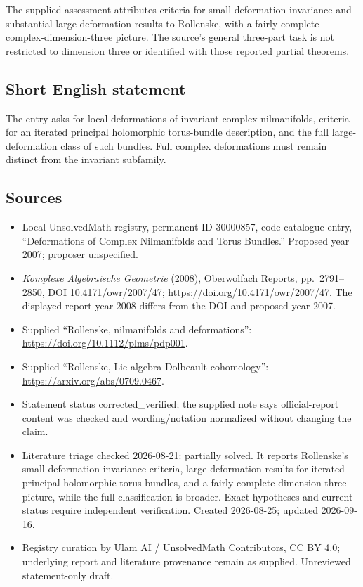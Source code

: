 \documentclass[11pt]{article}
\begin{document}
The supplied assessment attributes criteria for small-deformation invariance and substantial large-deformation results to Rollenske, with a fairly complete complex-dimension-three picture. The source's general three-part task is not restricted to dimension three or identified with those reported partial theorems.
\subsection{Short English statement}
The entry asks for local deformations of invariant complex nilmanifolds, criteria for an iterated principal holomorphic torus-bundle description, and the full large-deformation class of such bundles. Full complex deformations must remain distinct from the invariant subfamily.
\subsection{Sources}
\begin{itemize}
\item Local UnsolvedMath registry, permanent ID 30000857, code catalogue entry, ``Deformations of Complex Nilmanifolds and Torus Bundles.'' Proposed year 2007; proposer unspecified.
\item \emph{Komplexe Algebraische Geometrie} (2008), Oberwolfach Reports, pp.\ 2791--2850, DOI 10.4171/owr/2007/47; \url{https://doi.org/10.4171/owr/2007/47}. The displayed report year 2008 differs from the DOI and proposed year 2007.
\item Supplied ``Rollenske, nilmanifolds and deformations'': \url{https://doi.org/10.1112/plms/pdp001}.
\item Supplied ``Rollenske, Lie-algebra Dolbeault cohomology'': \url{https://arxiv.org/abs/0709.0467}.
\item Statement status corrected\_verified; the supplied note says official-report content was checked and wording/notation normalized without changing the claim.
\item Literature triage checked 2026-08-21: partially solved. It reports Rollenske's small-deformation invariance criteria, large-deformation results for iterated principal holomorphic torus bundles, and a fairly complete dimension-three picture, while the full classification is broader. Exact hypotheses and current status require independent verification. Created 2026-08-25; updated 2026-09-16.
\item Registry curation by Ulam AI / UnsolvedMath Contributors, CC BY 4.0; underlying report and literature provenance remain as supplied. Unreviewed statement-only draft.
\end{itemize}
\end{document}
